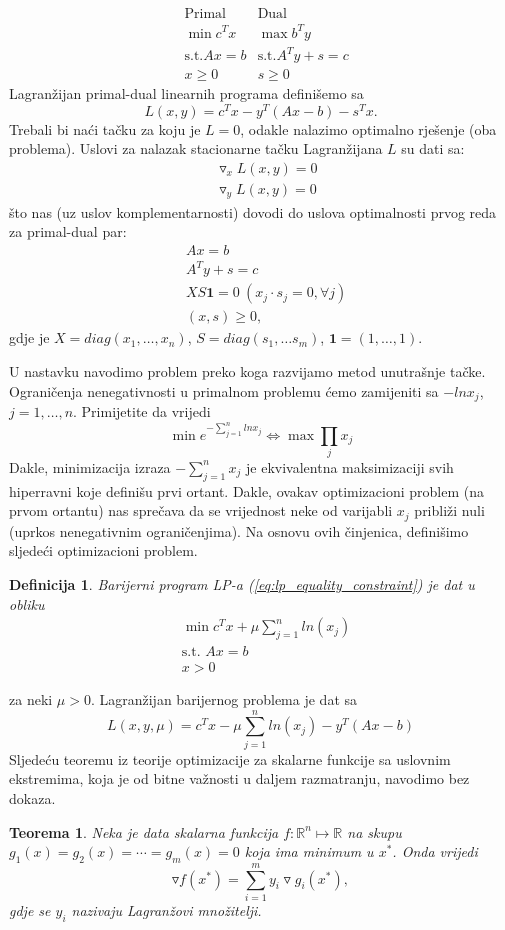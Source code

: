 \documentclass[a4paper, utf8, 11pt, colorlinks]{book}
\newtheorem{definition}{Definicija}
\newtheorem{thm}{Teorema}
\begin{document}
$$ \begin{array}{lll}
	&\mbox{Primal}            & \mbox{Dual}     \\
	&\min  c^T x              & \max  b^T y \\
	& \mbox{s.t.} Ax = b      &   \mbox{s.t.} A^Ty + s = c \\
	& x \geq 0                &   s \geq 0
\end{array}
$$
Lagranžijan primal-dual linearnih programa definišemo sa 
\begin{equation}
	L(x,y) = c^Tx - y^T(Ax - b) - s^T x.
\end{equation}
Trebali bi naći tačku za koju je $L = 0$, odakle nalazimo optimalno rješenje (oba problema).  Uslovi za nalazak stacionarne tačku Lagranžijana $L$ su dati sa:
\begin{align}
	&\triangledown_x L(x,y) = 0\\
	&\triangledown_y L(x,y) = 0
\end{align} 
što nas (uz uslov komplementarnosti) dovodi do uslova optimalnosti prvog reda za primal-dual par:
\begin{align}
	&Ax = b \\
	&A^T y + s = c \\
	&XS\mathbf{1} = 0 \ (x_j \cdot s_j =0 , \forall j) \\
	&  (x, s ) \geq 0,
\end{align}
gdje je $X = diag (x_1, \ldots, x_n)$, $S= diag(s_1,\ldots s_m)$, $\mathbf{1}=(1,\ldots, 1)$.

U nastavku navodimo problem preko koga razvijamo metod unutrašnje tačke. Ograničenja nenegativnosti u primalnom problemu ćemo zamijeniti sa $-ln x_j$, $j=1,\ldots,n$.   
Primijetite da vrijedi 
$$\min e^{-\sum_{j=1}^n ln x_j} \Leftrightarrow \max \prod_{j} x_j $$
Dakle, minimizacija izraza $-\sum_{j=1}^n x_j$ je ekvivalentna maksimizaciji svih hiperravni koje definišu prvi ortant. Dakle, ovakav optimizacioni problem (na prvom ortantu) nas sprečava da se vrijednost neke od varijabli $x_j$ približi nuli (uprkos nenegativnim ograničenjima).  Na osnovu ovih činjenica, definišimo sljedeći optimizacioni problem. 

\begin{definition}
	Barijerni program LP-a (\ref{eq:lp_equality_constraint}) je dat u obliku 
	\begin{align*}
		&\min c^T x + \mu \sum_{j=1}^n ln(x_j) \\
		&\mbox{s.t. } A x = b \\
		& x > 0
	\end{align*}
\end{definition}
za neki $\mu >0$. Lagranžijan barijernog problema je dat sa 
$$  L(x, y, \mu) = c^T x - \mu \sum_{j=1}^n ln(x_j)  - y^T(Ax - b) $$
Sljedeću teoremu iz teorije optimizacije  za skalarne funkcije sa uslovnim ekstremima, koja je od bitne važnosti u daljem razmatranju, navodimo   bez dokaza. 
\begin{thm}
	Neka je data skalarna funkcija  $f:\mathbb{R}^n \mapsto \mathbb{R}$ na skupu $g_1(x)=g_2(x)= \cdots = g_m(x) =0$ koja ima minimum u $x^*$. Onda vrijedi 
	$$ \triangledown f (x^*) = \sum_{i=1}^m y_i \triangledown g_i(x^*),$$
	gdje se $y_i$ nazivaju Lagranžovi množitelji. 
\end{thm}
\end{document}
